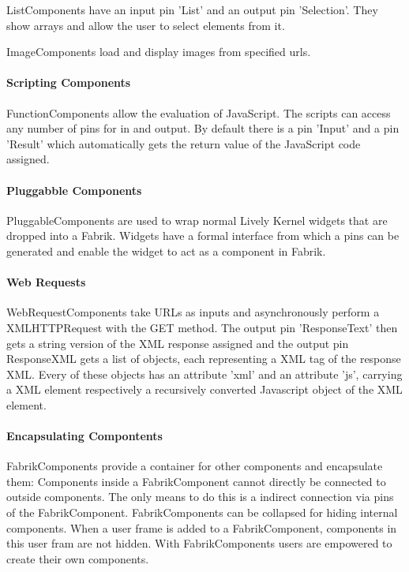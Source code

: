 \documentclass[pdftex, times, 10pt, twocolumn]{article}
\begin{document}
ListComponents have an input pin 'List' and an output pin 'Selection'. They show arrays and allow the user to select elements from it. 

ImageComponents load and display images from specified urls. 



\paragraph{Scripting Components}
FunctionComponents allow the evaluation of JavaScript. The scripts can access any  number of pins for in and output. By default there is a pin 'Input' and a pin 'Result' which automatically gets the return value of the JavaScript code assigned. 



\paragraph{Pluggabble Components}
PluggableComponents are used to wrap normal Lively Kernel widgets that are dropped into a Fabrik. Widgets have a formal interface from which a pins can be generated and enable the widget to act as a component in Fabrik.  



\paragraph{Web Requests}
WebRequestComponents take URLs as inputs and asynchronously perform a XMLHTTPRequest with the GET method. The output pin 'ResponseText' then gets a string version of the XML response assigned and the output pin ResponseXML gets a list of objects, each representing a XML tag of the response XML. Every of these objects has an attribute 'xml' and an attribute 'js', carrying a XML element respectively a recursively converted Javascript object of the XML element.  

\paragraph{Encapsulating Compontents}
FabrikComponents provide a container for other components and encapsulate them: Components inside a FabrikComponent cannot directly be connected to outside components. The only means to do this is a indirect connection via pins of the FabrikComponent. FabrikComponents can be collapsed for hiding internal components. When a user frame is added to a FabrikComponent, components in this user fram are not hidden. With FabrikComponents users are empowered to create their own components. 
\end{document}
